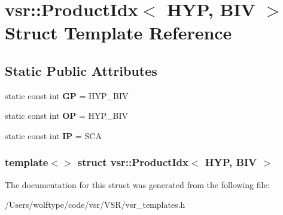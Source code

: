 \hypertarget{structvsr_1_1_product_idx_3_01_h_y_p_00_01_b_i_v_01_4}{\section{vsr\-:\-:Product\-Idx$<$ H\-Y\-P, B\-I\-V $>$ Struct Template Reference}
\label{structvsr_1_1_product_idx_3_01_h_y_p_00_01_b_i_v_01_4}
}
\subsection*{Static Public Attributes}
\begin{DoxyCompactItemize}
\item 
\hypertarget{structvsr_1_1_product_idx_3_01_h_y_p_00_01_b_i_v_01_4_acd83bd03f8454f72bf96282295d50df6}{static const int {\bfseries G\-P} = H\-Y\-P\-\_\-\-B\-I\-V}\label{structvsr_1_1_product_idx_3_01_h_y_p_00_01_b_i_v_01_4_acd83bd03f8454f72bf96282295d50df6}

\item 
\hypertarget{structvsr_1_1_product_idx_3_01_h_y_p_00_01_b_i_v_01_4_a116221100b27ff8ed0d959e1ee10a055}{static const int {\bfseries O\-P} = H\-Y\-P\-\_\-\-B\-I\-V}\label{structvsr_1_1_product_idx_3_01_h_y_p_00_01_b_i_v_01_4_a116221100b27ff8ed0d959e1ee10a055}

\item 
\hypertarget{structvsr_1_1_product_idx_3_01_h_y_p_00_01_b_i_v_01_4_a30d82d8671804fda2d9edc021807d342}{static const int {\bfseries I\-P} = S\-C\-A}\label{structvsr_1_1_product_idx_3_01_h_y_p_00_01_b_i_v_01_4_a30d82d8671804fda2d9edc021807d342}

\end{DoxyCompactItemize}
\subsubsection*{template$<$$>$ struct vsr\-::\-Product\-Idx$<$ H\-Y\-P, B\-I\-V $>$}



The documentation for this struct was generated from the following file\-:\begin{DoxyCompactItemize}
\item 
/\-Users/wolftype/code/vsr/\-V\-S\-R/vsr\-\_\-templates.\-h\end{DoxyCompactItemize}
